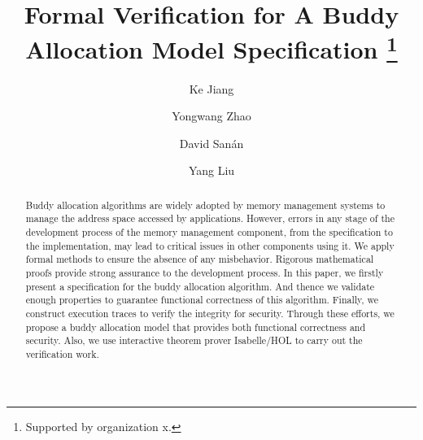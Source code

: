 \documentclass[runningheads]{llncs}
\begin{document}
\title{Formal Verification for A Buddy Allocation Model Specification
	\thanks{Supported by organization x.}}


\author{Ke Jiang \and
		Yongwang Zhao \and
		David San\'{a}n \and
		Yang Liu}




\maketitle


\begin{abstract}
Buddy allocation algorithms are widely adopted by memory management systems to manage the address space accessed by applications. However, errors in any stage of the development process of the memory management component, from the specification to the implementation, may lead to critical issues in other components using it. We apply formal methods to ensure the absence of any misbehavior. Rigorous mathematical proofs provide strong assurance to the development process. In this paper, we firstly present a specification for the buddy allocation algorithm. And thence we validate enough properties to guarantee functional correctness of this algorithm. Finally, we construct execution traces to verify the integrity for security. Through these efforts, we propose a buddy allocation model that provides both functional correctness and security. Also, we use interactive theorem prover Isabelle/HOL to carry out the verification work.

\end{abstract}
\end{document}
